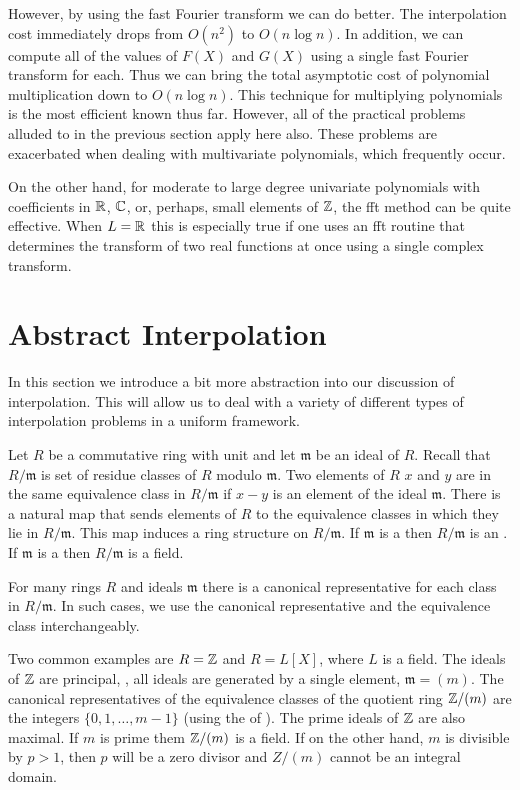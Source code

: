 However, by using the fast Fourier transform we can do better.  The
interpolation cost immediately drops from $O(n^2)$ to $O(n \log n)$.
In addition, we can compute all of the values of $F(X)$ and $G(X)$
using a single fast Fourier transform for each.  Thus we can bring the
total asymptotic cost of polynomial multiplication down to $O(n \log
n)$.  This technique for multiplying polynomials is the most efficient
known thus far.  However, all of the practical problems alluded to in
the previous section apply here also.  These problems are exacerbated
when dealing with multivariate polynomials, which frequently occur.

On the other hand, for moderate to large degree univariate polynomials
with coefficients in $\mathbb{R}$, $\mathbb{C}$, or, perhaps, small elements of $\mathbb{Z}$,
the {\sc fft} method can be quite effective.  When $L = \mathbb{R}$ this is
especially true if one uses an {\sc fft} routine that determines the
transform of two real functions at once using a single complex
transform.



\section{Abstract Interpolation} 
\label{Interp:Abstract:Sec}

In this section we introduce a bit more abstraction into our
discussion of interpolation.  This will allow us to deal with a
variety of different types of interpolation problems in a uniform
framework.

Let $R$ be a commutative ring with unit and let $\mathfrak{m}$ be an
ideal of $R$.  Recall that $R/\mathfrak{m}$ is set of residue classes of
$R$ modulo $\mathfrak{m}$.  Two elements of $R$ $x$ and $y$ are in the
same equivalence class in $R/\mathfrak{m}$ if $x - y$ is an element of
the ideal $\mathfrak{m}$.  There is a natural map that sends elements of
$R$ to the equivalence classes in which they lie in $R/\mathfrak{m}$.
This map induces a ring structure on $R/\mathfrak{m}$.  If $\mathfrak{m}$ is
a  then $R/\mathfrak{m}$ is an .
If $\mathfrak{m}$ is a  then $R/\mathfrak{m}$ is a field.

For many rings $R$ and ideals $\mathfrak{m}$ there is a canonical
representative for each class in $R/\mathfrak{m}$.  In such cases, we use
the canonical representative and the equivalence class
interchangeably.

Two common examples are $R = \mathbb{Z}$ and $R = L[X]$, where $L$ is a field.
The ideals of $\mathbb{Z}$ are principal, \ie, all ideals are generated by a
single element, $\mathfrak{m} = (m)$.  The canonical representatives of
the equivalence classes of the quotient ring $\mathbb{Z}/(m)$ are the integers
$\{0, 1, \ldots, m-1\}$ (using the  of
).  The prime ideals of $\mathbb{Z}$ are also
maximal.  If $m$ is prime them $\mathbb{Z}/(m)$ is a field.  If on the
other hand, $m$ is divisible by $p > 1$, then $p$ will be a zero
divisor and $Z/(m)$ cannot be an integral domain.

